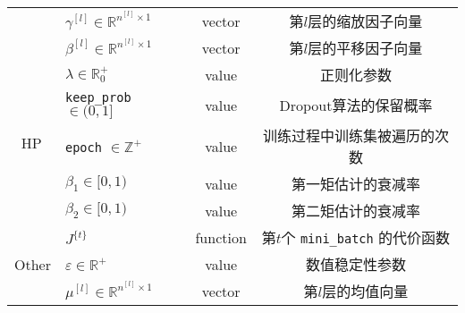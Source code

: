 \begin{table}[h!tbp]
\begin{threeparttable}
\begin{tabular}{clcc}
                                        & $\gamma^{[l]} \in \mathbb{R}^{n^{[l]} \times 1}$                                      & vector               & 第$l$层的缩放因子向量                                                 \\
                                        & $\beta^{[l]} \in \mathbb{R}^{n^{[l]} \times 1}$                                       & vector               & 第$l$层的平移因子向量                                                 \\
        \midrule
        \multirow{5}{*}{HP\,\tnote{a}}  & $\lambda \in \mathbb{R}^+_0$                                                          & value                & 正则化参数                                                             \\  
                                        & \verb|keep_prob| $\in (0,1]$                                                          & value                & Dropout算法的保留概率                                                   \\ 
                                        & \verb|epoch| $\in \mathbb{Z}^+$                                                       & value                & 训练过程中训练集被遍历的次数                                           \\
                                        & $\beta_1 \in [0,1)$                                                                   & value                & 第一矩估计的衰减率                                                    \\ 
                                        & $\beta_2 \in [0,1)$                                                                   & value                & 第二矩估计的衰减率                                                     \\
        \midrule
        \multirow{4}{*}{Other}          & $J^{\{t\}}$                                                                           & function             & 第$t$个 \verb|mini_batch| 的代价函数                                   \\ 
                                        & $\varepsilon \in \mathbb{R}^+$                                                        & value                & 数值稳定性参数                                                        \\
                                        & $\mu^{[l]} \in \mathbb{R}^{n^{[l]} \times 1}$                                         & vector               & 第$l$层的均值向量                                                       \\

\end{tabular}
\end{threeparttable}
\end{table}
